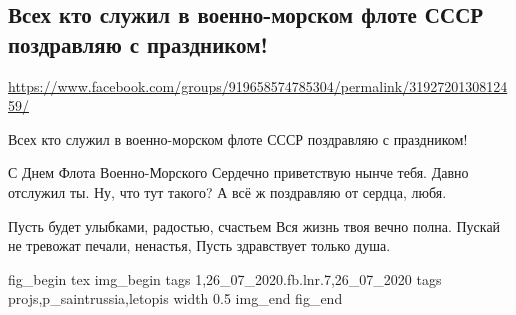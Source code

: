  
 
  
\clearpage
\subsection{Всех кто служил в военно-морском флоте СССР поздравляю с праздником!}
\label{sec:26_07_2020.fb.lnr.7}
\url{https://www.facebook.com/groups/919658574785304/permalink/3192720130812459/}


Всех кто служил в военно-морском флоте СССР поздравляю с праздником!

С Днем Флота Военно-Морского
Сердечно приветствую нынче тебя.
Давно отслужил ты. Ну, что тут такого?
А всё ж поздравляю от сердца, любя.

Пусть будет улыбками, радостью, счастьем
Вся жизнь твоя вечно полна.
Пускай не тревожат печали, ненастья,
Пусть здравствует только душа.

\ifcmt
fig_begin 
  tex \centering
  img_begin 
    tags 1,26_07_2020.fb.lnr.7,26_07_2020
    tags projs,p_saintrussia,letopis
    width 0.5
  img_end
fig_end
\fi
